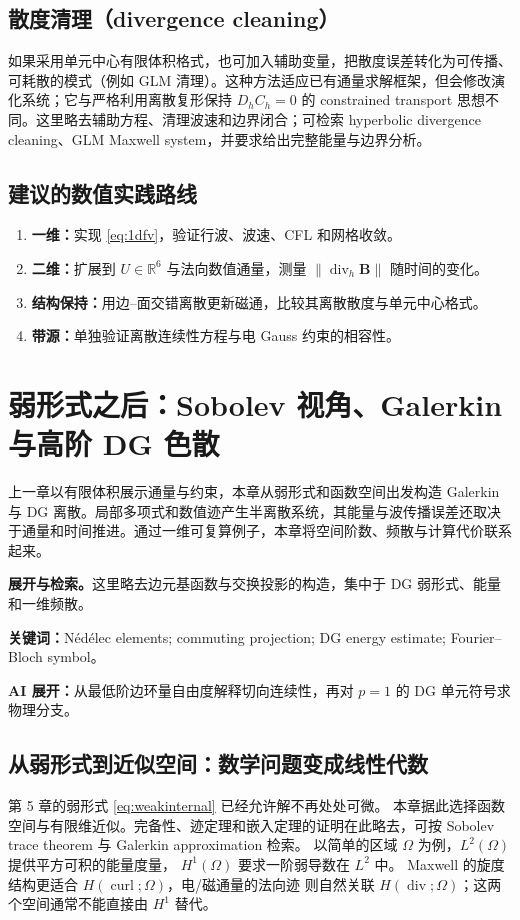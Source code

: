 \documentclass[UTF8,11pt,openany]{ctexbook}
\numberwithin{equation}{chapter}
\theoremstyle{definition}
\theoremstyle{remark}
\newcommand{\RR}{\mathbb R}
\newcommand{\Div}{\operatorname{div}}
\newcommand{\curl}{\operatorname{curl}}
\newcommand{\norm}[1]{\left\lVert #1\right\rVert}
\newcommand{\studyroute}[3]{%
  \par\smallskip\noindent\textbf{展开与检索。}#1\par
  \noindent\textbf{关键词：}#2。\par
  \noindent\textbf{AI 展开：}#3\par
}
\begin{document}
\section{散度清理（divergence cleaning）}
如果采用单元中心有限体积格式，也可加入辅助变量，把散度误差转化为可传播、可耗散的模式（例如 GLM 清理）。这种方法适应已有通量求解框架，但会修改演化系统；它与严格利用离散复形保持 $D_hC_h=0$ 的 constrained transport 思想不同。这里略去辅助方程、清理波速和边界闭合；可检索 hyperbolic divergence cleaning、GLM Maxwell system，并要求给出完整能量与边界分析。

\section{建议的数值实践路线}
\begin{enumerate}
\item \textbf{一维：}实现 \eqref{eq:1dfv}，验证行波、波速、CFL 和网格收敛。
\item \textbf{二维：}扩展到 $U\in\RR^6$ 与法向数值通量，测量 $\norm{\Div_h\bm B}$ 随时间的变化。
\item \textbf{结构保持：}用边--面交错离散更新磁通，比较其离散散度与单元中心格式。
\item \textbf{带源：}单独验证离散连续性方程与电 Gauss 约束的相容性。
\end{enumerate}


\chapter{弱形式之后：Sobolev 视角、Galerkin 与高阶 DG 色散}\label{ch:dg}
\begin{chaptersummary}
上一章以有限体积展示通量与约束，本章从弱形式和函数空间出发构造 Galerkin 与 DG 离散。局部多项式和数值迹产生半离散系统，其能量与波传播误差还取决于通量和时间推进。通过一维可复算例子，本章将空间阶数、频散与计算代价联系起来。
\end{chaptersummary}
\studyroute{这里略去边元基函数与交换投影的构造，集中于 DG 弱形式、能量和一维频散。}{N\'ed\'elec elements; commuting projection; DG energy estimate; Fourier--Bloch symbol}{从最低阶边环量自由度解释切向连续性，再对 $p=1$ 的 DG 单元符号求物理分支。}
\section{从弱形式到近似空间：数学问题变成线性代数}
第 5 章的弱形式 \eqref{eq:weakinternal} 已经允许解不再处处可微。
本章据此选择函数空间与有限维近似。完备性、迹定理和嵌入定理的证明在此略去，可按 Sobolev trace theorem 与 Galerkin approximation 检索。
以简单的区域 $\Omega$ 为例，$L^2(\Omega)$ 提供平方可积的能量度量，
$H^1(\Omega)$ 要求一阶弱导数在 $L^2$ 中。
Maxwell 的旋度结构更适合 $H(\curl;\Omega)$，电/磁通量的法向迹
则自然关联 $H(\Div;\Omega)$；这两个空间通常不能直接由 $H^1$ 替代。
\end{document}
